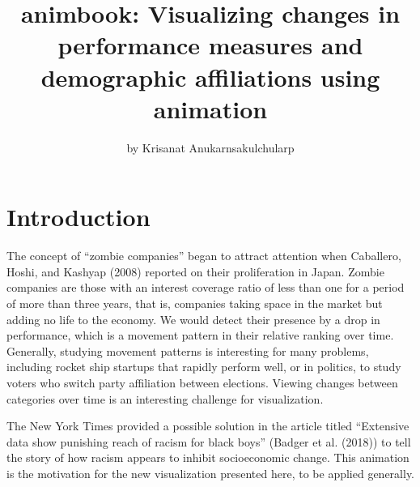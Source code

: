 \title{animbook: Visualizing changes in performance measures and demographic affiliations using animation}
\author{by Krisanat Anukarnsakulchularp}

\maketitle


\hypertarget{introduction}{%
\section{Introduction}\label{introduction}}

The concept of ``zombie companies'' began to attract attention when Caballero, Hoshi, and Kashyap (2008) reported on their proliferation in Japan. Zombie companies are those with an interest coverage ratio of less than one for a period of more than three years, that is, companies taking space in the market but adding no life to the economy. We would detect their presence by a drop in performance, which is a movement pattern in their relative ranking over time. Generally, studying movement patterns is interesting for many problems, including rocket ship startups that rapidly perform well, or in politics, to study voters who switch party affiliation between elections. Viewing changes between categories over time is an interesting challenge for visualization.

The New York Times provided a possible solution in the article titled ``Extensive data show punishing reach of racism for black boys'' (Badger et al. (2018)) to tell the story of how racism appears to inhibit socioeconomic change. This animation is the motivation for the new visualization presented here, to be applied generally.

